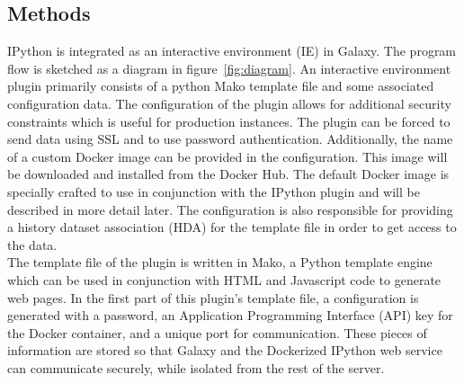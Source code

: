 \documentclass{bioinfo}
\begin{document}
\begin{methods}
\section{Methods}

IPython is integrated as an interactive environment (IE) in Galaxy. The program flow is sketched as a diagram in 
figure~\ref{fig:diagram}. An interactive environment plugin primarily consists of a python Mako template file and some
associated configuration data. The configuration of the plugin allows for additional security constraints which is useful
for production instances. The plugin can be forced to send data using SSL and to use password authentication.
Additionally, the name of a custom Docker image can be provided in the configuration. This image will be downloaded and 
installed from the Docker Hub. The default Docker image is specially crafted to use in conjunction with the IPython plugin
and will be described in more detail later. The configuration is also responsible for providing a history dataset 
association (HDA) for the template file in order to get access to the data. \\
The template file of the plugin is written in Mako, a Python template engine which can be used in conjunction with HTML
and Javascript code to generate web pages. In the first part of this plugin's template file, a configuration is generated with a password, 
an Application Programming Interface (API) key for the Docker container, and a unique port for communication. These pieces of information are stored so that Galaxy
and the Dockerized IPython web service can communicate securely, while isolated from the rest of the server.


\end{methods}
\end{document}
